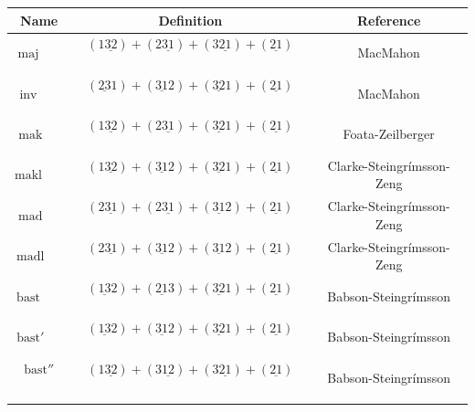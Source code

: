 \documentclass[12pt]{amsart}
\numberwithin{equation}{section}
\theoremstyle{plain}
\theoremstyle{definition}
\def\inv{\mathrm{inv}}
\def\mak{\mathrm{mak}}
\def\mad{\mathrm{mad}}
\def\mak{\mathrm{mak}}
\def\inv{\mathrm{inv}}
\def\makl{\mathrm{makl}}
\def\madl{\mathrm{madl}}
\def\maj{\mathrm{maj}}
\def\bast{\mathrm{bast}}
\begin{document}
\begin{table}[htb]
{\small
\begin{tabular*}{5in}{ccc}
\toprule
Name  & Definition & Reference\\
\midrule\vspace{4pt}
$\maj$ \,\,\,\,\,\,\,\,& $(1\underline{32})+(2\underline{31})+(3\underline{21})+(\underline{21})$ \,\,\,\,\,\,\,\,& MacMahon \cite{M}\\\vspace{4pt}


$\inv$ \,\,\,\,\,\,\,\,& $(\underline{23}1)+(\underline{31}2)+(\underline{32}1)+(\underline{21})$ \,\,\,\,\,\,\,\,& MacMahon \cite{M}\\\vspace{4pt}


$\mak$\,\,\,\,\,\,\,\, & $(1\underline{32})+(2\underline{31})+(\underline{32}1)+(\underline{21})$ \,\,\,\,\,\,\,\,& Foata-Zeilberger\cite{FZ90}\\\vspace{4pt}


$\makl$ \,\,\,\,\,\,\,\,& $(1\underline{32})+(\underline{31}2)+(\underline{32}1)+(\underline{21})$ \,\,\,\,\,\,\,\,& Clarke-Steingr\'{i}msson-Zeng \cite{CSZ}\\\vspace{4pt}


$\mad$\,\,\,\,\,\,\,\, & $(2\underline{31})+(2\underline{31})+(\underline{31}2)+(\underline{21})$ \,\,\,\,\,\,\,\,& Clarke-Steingr\'{i}msson-Zeng \cite{CSZ} \\\vspace{4pt}

$\madl$\,\,\,\,\,\,\,\, & $(2\underline{31})+(\underline{31}2)+(\underline{31}2)+(\underline{21})$ \,\,\,\,\,\,\,\,& Clarke-Steingr\'{i}msson-Zeng \cite{CSZ} \\\vspace{4pt}

$\bast$ \,\,\,\,\,\,\,\,& $(\underline{13}2)+(\underline{21}3)+(\underline{32}1)+(\underline{21})$ \,\,\,\,\,\,\,\,& Babson-Steingr\'{i}msson \cite{BS} \\\vspace{4pt}

$\bast'$\,\,\,\,\,\,\,\, & $(\underline{13}2)+(\underline{31}2)+(\underline{32}1)+(\underline{21})$ \,\,\,\,\,\,\,\,& Babson-Steingr\'{i}msson \cite{BS} \\\vspace{4pt}


 $\bast''$ \,\,\,\,\,\,\,\,& $(1\underline{32})+(3\underline{12})+(3\underline{21})+(\underline{21})$ \,\,\,\,\,\,\,\,& Babson-Steingr\'{i}msson \cite{BS} \\\vspace{4pt}


\end{tabular*}}
\end{table}
\end{document}
